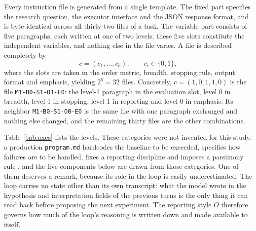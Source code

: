 \documentclass[11pt]{article}
\begin{document}
Every instruction file is generated from a single template. The fixed part specifies the research question, the executor interface and the JSON response format, and is byte-identical across all thirty-two files of a task. The variable part consists of five paragraphs, each written at one of two levels; these five slots constitute the independent variables, and nothing else in the file varies. A file is described completely by
\[
c = (c_1,\ldots,c_5), \qquad c_i \in \{0,1\},
\]
where the slots are taken in the order metric, breadth, stopping rule, output format and emphasis, yielding $2^5 = 32$ files. Concretely, $c = (1,0,1,1,0)$ is the file \texttt{M1-B0-S1-O1-E0}: the level-1 paragraph in the evaluation slot, level 0 in breadth, level 1 in stopping, level 1 in reporting and level 0 in emphasis. Its neighbor \texttt{M1-B0-S1-O0-E0} is the same file with one paragraph exchanged and nothing else changed, and the remaining thirty files are the other combinations.

Table~\ref{tab:axes} lists the levels. These categories were not invented for this study: a production \texttt{program.md} hardcodes the baseline to be exceeded, specifies how failures are to be handled, fixes a reporting discipline and imposes a parsimony rule \cite{Tuychiev2026guide}, and the five components below are drawn from those categories. One of them deserves a remark, because its role in the loop is easily underestimated. The loop carries no state other than its own transcript: what the model wrote in the hypothesis and interpretation fields of the previous turns is the only thing it can read back before proposing the next experiment. The reporting style $O$ therefore governs how much of the loop's reasoning is written down and made available to itself.
\end{document}
